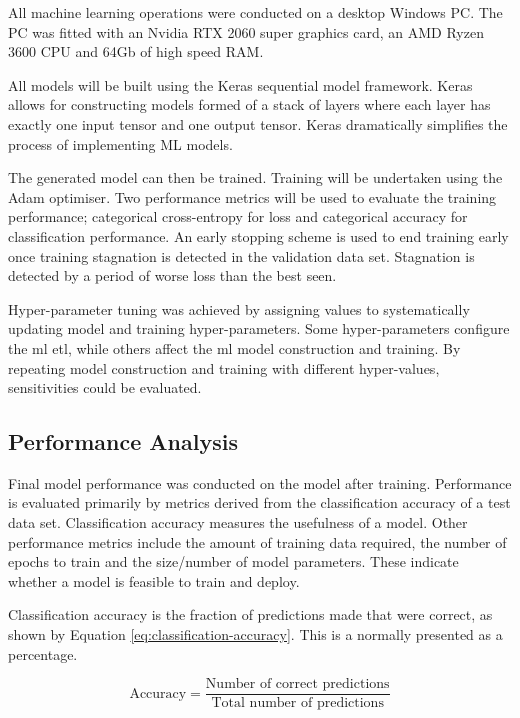 All machine learning operations were conducted on a desktop Windows PC. The PC was fitted with an Nvidia RTX 2060 super graphics card, an AMD Ryzen 3600 CPU and 64Gb of high speed RAM.

All models will be built using the Keras sequential model framework. Keras allows for constructing models formed of a stack of layers where each layer has exactly one input tensor and one output tensor. Keras dramatically simplifies the process of implementing ML models.

The generated model can then be trained. Training will be undertaken using the Adam optimiser\cite{Kingma2015}. Two performance metrics will be used to evaluate the training performance; categorical cross-entropy for loss and categorical accuracy for classification performance. An early stopping scheme is used to end training early once training stagnation is detected in the validation data set. Stagnation is detected by a period of worse loss than the best seen.

Hyper-parameter tuning was achieved by assigning values to systematically updating model and training hyper-parameters. Some hyper-parameters configure the \acrshort{ml} \acrshort{etl}, while others affect the \acrshort{ml} model construction and training. By repeating model construction and training with different hyper-values, sensitivities could be evaluated.

\subsection{Performance Analysis}
Final model performance was conducted on the model after training. Performance is evaluated primarily by metrics derived from the classification accuracy of a test data set. Classification accuracy measures the usefulness of a model. Other performance metrics include the amount of training data required, the number of epochs to train and the size/number of model parameters. These indicate whether a model is feasible to train and deploy.

Classification accuracy is the fraction of predictions made that were correct, as shown by Equation \ref{eq:classification-accuracy}. This is a normally presented as a percentage.

\begin{equation}
    \label{eq:classification-accuracy}
    \textrm{Accuracy} = \frac{\textrm{Number of correct predictions}}{\textrm{Total number of predictions}}
\end{equation}

